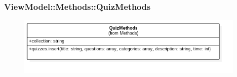 \subsubsection{ViewModel::Methods::QuizMethods}
\begin{figure}[h!]
\begin{center}
	\includegraphics[scale=0.4]{../images/ViewModel/Methods/QuizMethods.png}
\end{center}
\end{figure}
